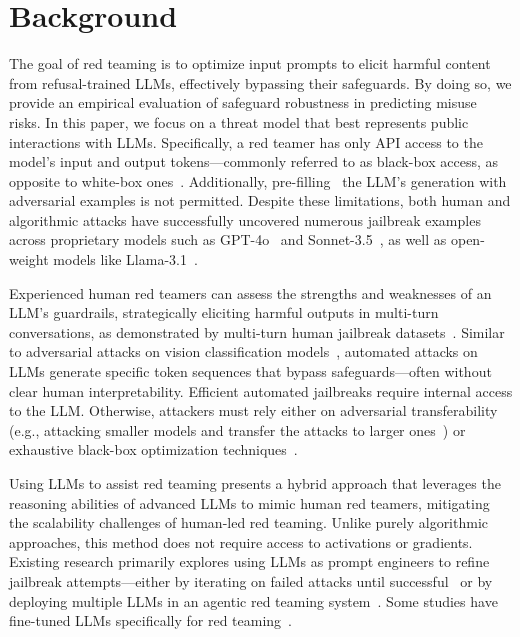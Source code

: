 \section{Background}\label{sec:background}

The goal of red teaming is to optimize input prompts to elicit harmful content from refusal-trained LLMs, effectively bypassing their safeguards. By doing so, we provide an empirical evaluation of safeguard robustness in predicting misuse risks. In this paper, we focus on a threat model that best represents public interactions with LLMs. Specifically, a red teamer has only API access to the model’s input and output tokens—commonly referred to as black-box access, as opposite to white-box ones~\citep{schwinn2024revisitingrobustalignmentcircuit,arditi2024rmu,zou2023representation,lermen2024lorafinetuningefficientlyundoes}. Additionally, pre-filling~\citep{andriushchenko2024jailbreaking} the LLM’s generation with adversarial examples is not permitted. Despite these limitations, both human and algorithmic attacks have successfully uncovered numerous jailbreak examples across proprietary models such as GPT-4o~\cite{openai2024gpt4ocard} and Sonnet-3.5~\cite{Anthropic}, as well as open-weight models like Llama-3.1~\citep{dubey2024llama}. 

Experienced human red teamers can assess the strengths and weaknesses of an LLM’s guardrails, strategically eliciting harmful outputs in multi-turn conversations, as demonstrated by multi-turn human jailbreak datasets~\citep{li2024llmdefensesrobustmultiturn}. Similar to adversarial attacks on vision classification models~\citep{szegedy2013intriguing, madry2017towards}, automated attacks on LLMs generate specific token sequences that bypass safeguards—often without clear human interpretability. Efficient automated jailbreaks require internal access to the LLM. Otherwise, attackers must rely either on adversarial transferability (e.g., attacking smaller models and transfer the attacks to larger ones~\citep{zou2023universal}) or exhaustive black-box optimization techniques~\citep{maus2023blackboxadversarialprompting, hughes2024bestofnjailbreaking}.

Using LLMs to assist red teaming presents a hybrid approach that leverages the reasoning abilities of advanced LLMs to mimic human red teamers, mitigating the scalability challenges of human-led red teaming. Unlike purely algorithmic approaches, this method does not require access to activations or gradients. Existing research primarily explores using LLMs as prompt engineers to refine jailbreak attempts—either by iterating on failed attacks until successful~\citep{chao2023jailbreaking,mehrotra2023treeOfAttacks,yu2023gptfuzzer,casper2023explore,ding2023wolf,russinovich2024great,anil2024many,sun2024multiturncontextjailbreakattack, pavlova2024automatedredteaminggoat, samvelyan2024rainbow} or by deploying multiple LLMs in an agentic red teaming system~\citep{ren2024derailyourselfmultiturnllm, sabbaghi2025adversarialreasoningjailbreakingtime}. Some studies have fine-tuned LLMs specifically for red teaming~\citep{beutel2024diverseeffectiveredteaming}.

